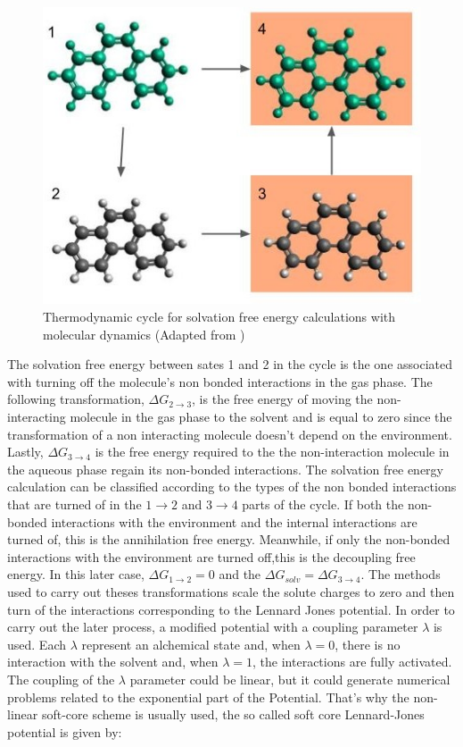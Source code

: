 \begin{figure}[th]
\centering
\includegraphics[scale=0.6]{Figures/cicclotermo.jpg}
\caption{Thermodynamic cycle for solvation free energy calculations with molecular dynamics (Adapted from )}
\label{thermcy}
\end{figure}

The solvation free energy between sates 1 and 2 in the cycle is the one associated with turning off the molecule's non bonded interactions in the gas phase. The following transformation, $\Delta G_{2 \rightarrow 3}$, is the free energy of moving the non-interacting molecule in the gas phase to the solvent and is equal to zero since the transformation of a non interacting molecule doesn't depend on the environment. Lastly, $\Delta G_{3 \rightarrow 4}$ is the free energy required to the  the non-interaction molecule in the aqueous phase regain its non-bonded interactions.  The solvation free energy calculation can be classified according to the types of the non bonded interactions that are turned of in the $1 \rightarrow 2$ and $ 3 \rightarrow 4$ parts of the cycle. If both the non-bonded interactions with the environment and the internal interactions are turned of, this is the annihilation free energy. Meanwhile, if only the non-bonded interactions with the environment are turned off,this is the decoupling free energy. In this later case, $\Delta G_{1 \rightarrow 2} = 0$ and the $\Delta G_{solv} = \Delta G_{3 \rightarrow 4} $. The methods used to carry out theses transformations scale the solute charges to zero and then turn of the interactions corresponding to the Lennard Jones potential. In order to carry out the later process, a modified potential with a coupling parameter $\lambda$ is used. Each $\lambda$ represent an alchemical state and, when $\lambda=0$, there is no interaction with the solvent and, when $\lambda=1$, the interactions are fully activated. The coupling of the $\lambda$ parameter could be linear, but it could generate numerical problems related to the exponential part of the Potential. That's why the non-linear soft-core scheme \cite{beutler1994} is usually used, the so called soft core Lennard-Jones potential is given by:

